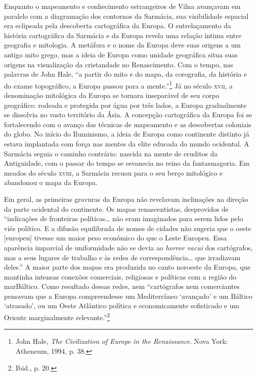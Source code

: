 Enquanto o mapeamento e conhecimento estrangeiros de Vilna avançavam em
paralelo com a diagramação dos contornos da Sarmácia, sua visibilidade
espacial era eclipsada pela descoberta cartográfica da Europa. O
entrelaçamento da história cartográfica da Sarmácia e da Europa revela
uma relação íntima entre geografia e mitologia. A metáfora e o nome da
Europa deve suas origens a um antigo mito grego, mas a ideia de Europa
como unidade geográfica situa suas origens na visualização da
cristandade no Renascimento. Com o tempo, nas palavras de John Hale, ``a
partir do mito e do mapa, da corografia, da história e do exame
topográfico, a Europa passou para a mente.''\footnote{John Hale, \textit{The Civilization of Europe in the Renaissance}. Nova York: Atheneum, 1994, p. 38.} Já no século \textsc{xvii}, a denominação mitológica da Europa se tornara inseparável de seu corpo geográfico: rodeada e
protegida por água por três lados, a Europa gradualmente se dissolvia no
vasto território da Ásia. A concepção cartográfica da Europa foi se
fortalecendo com o avanço das técnicas de mapeamento e as descobertas
coloniais do globo. No início do Iluminismo, a ideia de Europa como
continente distinto já estava implantada com força nas mentes da elite
educada do mundo ocidental. A Sarmácia seguia o caminho contrário:
nascida na mente de eruditos da Antiguidade, com o passar do tempo se
esvanecia no reino da fantasmagoria. Em meados do século \textsc{xviii}, a Sarmácia
recuou para o seu berço mitológico e abandonou o mapa da Europa.

Em geral, as primeiras gravuras da Europa não revelavam inclinações na
direção da parte ocidental do continente. Os mapas renascentistas,
desprovidos de ``indicações de fronteiras políticas\ldots{} não eram
imaginados para serem lidos pelo viés político. E a difusão equilibrada
de nomes de cidades não sugeria que o oeste {[}europeu{]} tivesse um
maior peso econômico do que o Leste Europeu. Essa aparência imparcial de
uniformidade não se devia ao \textit{horror vacui} dos cartógrafos,
mas a seus lugares de trabalho e às redes de correspondência\ldots{} que
irradiavam deles.'' A maior parte dos mapas era produzida no canto
noroeste da Europa, que mantinha intensas conexões comerciais,
religiosas e políticas com a região do marBáltico. Como resultado
dessas redes, nem ``cartógrafos nem comerciantes pensavam que a Europa
compreendesse um Mediterrâneo `avançado' e um Báltico `atrasado', ou um
Oeste Atlântico política e economicamente sofisticado e um Oriente
marginalmente relevante.''\footnote{Ibid., p. 20.}


